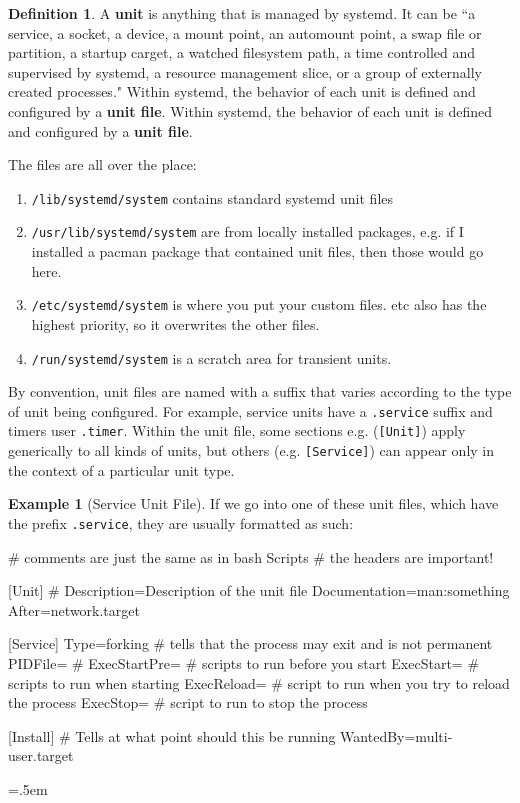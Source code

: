 \documentclass{article}
\theoremstyle{definition}
\newtheorem{example}{Example}[section]
\newtheorem{definition}{Definition}[section]
\newenvironment{cverbatim}
    {\SaveVerbatim{cverb}}
    {\endSaveVerbatim
    \flushleft\fboxrule=0pt\fboxsep=.5em
    \colorbox{cverbbg}{%
      \makebox[\dimexpr\linewidth-2\fboxsep][l]{\BUseVerbatim{cverb}}%
    }
    \endflushleft
  }
\begin{document}
    \begin{definition}
      A \textbf{unit} is anything that is managed by systemd. It can be ``a service, a socket, a device, a mount point, an automount point, a swap file or partition, a startup carget, a watched filesystem path, a time controlled and supervised by systemd, a resource management slice, or a group of externally created processes." Within systemd, the behavior of each unit is defined and configured by a \textbf{unit file}. Within systemd, the behavior of each unit is defined and configured by a \textbf{unit file}. 

      The files are all over the place: 
        \begin{enumerate}
          \item \texttt{/lib/systemd/system} contains standard systemd unit files 
          \item \texttt{/usr/lib/systemd/system} are from locally installed packages, e.g. if I installed a pacman package that contained unit files, then those would go here. 
          \item \texttt{/etc/systemd/system} is where you put your custom files. etc also has the highest priority, so it overwrites the other files.  
          \item \texttt{/run/systemd/system} is a scratch area for transient units. 
        \end{enumerate}

      By convention, unit files are named with a suffix that varies according to the type of unit being configured. For example, service units have a \texttt{.service} suffix and timers user \texttt{.timer}. Within the unit file, some sections e.g. (\texttt{[Unit]}) apply generically to all kinds of units, but others (e.g. \texttt{[Service]}) can appear only in the context of a particular unit type. 

    \end{definition}

    \begin{example}[Service Unit File]
      If we go into one of these unit files, which have the prefix \texttt{.service}, they are usually formatted as such: 

      \begin{cverbatim}
        # comments are just the same as in bash Scripts
        # the headers are important! 

        [Unit]        #  
        Description=Description of the unit file 
        Documentation=man:something 
        After=network.target

        [Service]
        Type=forking  # tells that the process may exit and is not permanent
        PIDFile=      # 
        ExecStartPre= # scripts to run before you start 
        ExecStart=    # scripts to run when starting 
        ExecReload=   # script to run when you try to reload the process
        ExecStop=     # script to run to stop the process 

        [Install]   # Tells at what point should this be running
        WantedBy=multi-user.target 

      \end{cverbatim} 
    \end{example}
    
\end{document}

